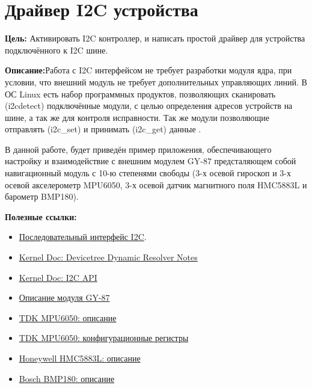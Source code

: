 \chapter{Драйвер I2C устройства}
\textbf{Цель:} Активировать I2C контроллер, и написать простой драйвер для устройства подключённого к I2C шине.

\vspace{5mm}
\textbf{Описание:}Работа с I2C интерфейсом не требует разработки модуля ядра, при условии, что внешний модуль не требует дополнительных управляющих линий. В ОС Linux есть набор программных продуктов, позволяющих сканировать (i2cdetect) подключённые модули, с целью определения адресов устройств на шине, а так же для контроля исправности. Так же модули позволяющие отправлять (i2c\_set) и принимать (i2c\_get) данные .

В данной работе, будет приведён пример приложения, обеспечивающего настройку и взаимодействие с внешним модулем GY-87 предсталяющем собой навигационный модуль с 10-ю степенями свободы (3-х осевой гироскоп и 3-х осевой акселерометр MPU6050, 3-х осевой датчик магнитного поля HMC5883L и барометр BMP180). 

\vspace{5mm}
\textbf{Полезные ссылки:}
\begin{itemize}
	\item \href{http://www.gaw.ru/html.cgi/txt/interface/iic/start.htm}{Последовательный интерфейс I2C}.
	\item \href{https://docs.kernel.org/devicetree/dynamic-resolution-notes.html}{Kernel Doc: Devicetree Dynamic Resolver Notes}
	\item \href{https://www.kernel.org/doc/html/v4.15/driver-api/i2c.html}{Kernel Doc: I2C API}	
	\item \href{https://hadex.cz/spec/m442d.pdf}{Описание модуля GY-87}
	\item \href{https://invensense.tdk.com/wp-content/uploads/2015/02/MPU-6000-Datasheet1.pdf}{TDK MPU6050: описание}
	\item \href{https://invensense.tdk.com/wp-content/uploads/2015/02/MPU-6000-Register-Map1.pdf}{TDK MPU6050: конфигурационные регистры}
	\item \href{https://cdn-shop.adafruit.com/datasheets/HMC5883L_3-Axis_Digital_Compass_IC.pdf}{Honeywell HMC5883L: описание}
	\item \href{https://cdn-shop.adafruit.com/datasheets/BST-BMP180-DS000-09.pdf}{Bosch BMP180: описание}
	
	
\end{itemize}

